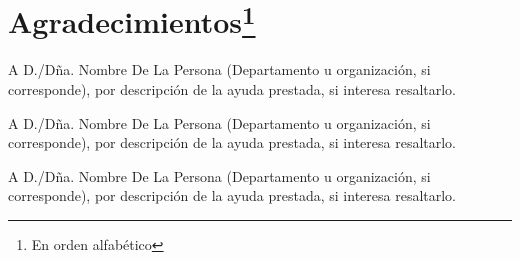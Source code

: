%
%

\section*{Agradecimientos\footnote{En orden alfabético}}

A D./Dña. Nombre De La Persona (Departamento u organización, si corresponde), por descripción de la ayuda prestada, si interesa resaltarlo.

A D./Dña. Nombre De La Persona (Departamento u organización, si corresponde), por descripción de la ayuda prestada, si interesa resaltarlo.

A D./Dña. Nombre De La Persona (Departamento u organización, si corresponde), por descripción de la ayuda prestada, si interesa resaltarlo.


